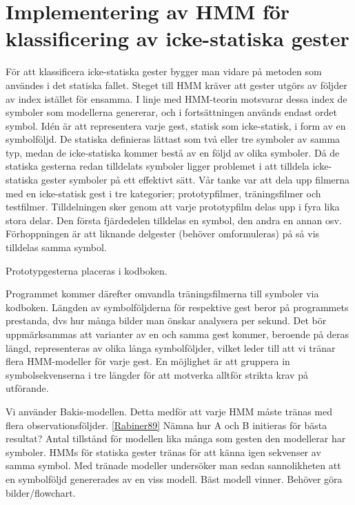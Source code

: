 \documentclass[../rapport_MVEX01-11-05]{subfiles}
\begin{document}
\section{Implementering av HMM för klassificering av icke-statiska gester}
För att klassificera icke-statiska gester bygger man vidare på metoden som användes i det 
statiska fallet. Steget till HMM kräver att gester utgörs av följder av index istället
för ensamma. I linje med HMM-teorin motsvarar dessa index de symboler som modellerna genererar, 
och i fortsättningen används endast ordet symbol. Idén är att representera varje gest, statisk som icke-statisk, i form av 
en symbolföljd. De statiska definieras lättast som två eller tre symboler av samma typ, medan 
de icke-statiska kommer bestå av en följd av olika symboler. Då de statiska gesterna redan tilldelats
symboler ligger problemet i att tilldela icke-statiska gester symboler på ett effektivt sätt. Vår tanke
var att dela upp filmerna med en icke-statisk gest i tre kategorier; prototypfilmer, träningsfilmer och 
testfilmer. Tilldelningen sker genom att varje prototypfilm delas upp i fyra lika stora delar. Den 
första fjärdedelen tilldelas en symbol, den andra en annan osv. Förhoppningen är att liknande 
delgester (behöver omformuleras) på så vis tilldelas samma symbol. 

Prototypgesterna placeras i kodboken. 

Programmet kommer därefter omvandla träningsfilmerna till symboler via kodboken. Längden av 
symbolföljderna för respektive gest beror på programmets prestanda, dvs hur många bilder 
man önskar analysera per sekund. Det bör uppmärksammas att varianter av en och samma gest 
kommer, beroende på deras längd, representeras av olika långa symbolföljder, vilket leder till 
att vi tränar flera HMM-modeller för varje gest. En möjlighet är att gruppera in symbolsekvenserna 
i tre längder för att motverka alltför strikta krav på utförande. 

Vi använder Bakis-modellen. 
Detta medför att varje HMM måste tränas med flera observationsföljder. \ref{Rabiner89}
Nämna hur A och B initieras för bästa resultat? 
Antal tillstånd för modellen lika många som gesten den modellerar har symboler.
HMMs för statiska gester tränas för att känna igen sekvenser av samma symbol.
Med tränade modeller undersöker man sedan sannolikheten att en symbolföljd genererades av en viss modell.
Bäst modell vinner.
Behöver göra bilder/flowchart.  

 
\end{document}

